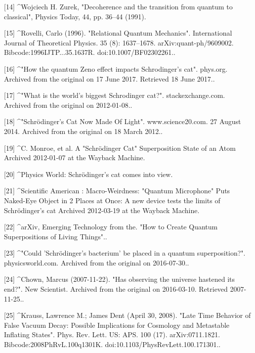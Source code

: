 [14]
^Wojciech H. Zurek, "Decoherence and the transition from quantum to classical", Physics Today, 44, pp. 36–44 (1991).

[15]
^Rovelli, Carlo (1996). "Relational Quantum Mechanics". International Journal of Theoretical Physics. 35 (8): 1637–1678. arXiv:quant-ph/9609002. Bibcode:1996IJTP...35.1637R. doi:10.1007/BF02302261..

[16]
^"How the quantum Zeno effect impacts Schrodinger's cat". phys.org. Archived from the original on 17 June 2017. Retrieved 18 June 2017..

[17]
^"What is the world's biggest Schrodinger cat?". stackexchange.com. Archived from the original on 2012-01-08..

[18]
^"Schrödinger's Cat Now Made Of Light". www.science20.com. 27 August 2014. Archived from the original on 18 March 2012..

[19]
^C. Monroe, et al. A "Schrödinger Cat" Superposition State of an Atom Archived 2012-01-07 at the Wayback Machine.

[20]
^Physics World: Schrödinger's cat comes into view.

[21]
^Scientific American : Macro-Weirdness: "Quantum Microphone" Puts Naked-Eye Object in 2 Places at Once: A new device tests the limits of Schrödinger's cat Archived 2012-03-19 at the Wayback Machine.

[22]
^arXiv, Emerging Technology from the. "How to Create Quantum Superpositions of Living Things"..

[23]
^"Could 'Schrödinger's bacterium' be placed in a quantum superposition?". physicsworld.com. Archived from the original on 2016-07-30..

[24]
^Chown, Marcus (2007-11-22). "Has observing the universe hastened its end?". New Scientist. Archived from the original on 2016-03-10. Retrieved 2007-11-25..

[25]
^Krauss, Lawrence M.; James Dent (April 30, 2008). "Late Time Behavior of False Vacuum Decay: Possible Implications for Cosmology and Metastable Inflating States". Phys. Rev. Lett. US: APS. 100 (17). arXiv:0711.1821. Bibcode:2008PhRvL.100q1301K. doi:10.1103/PhysRevLett.100.171301..